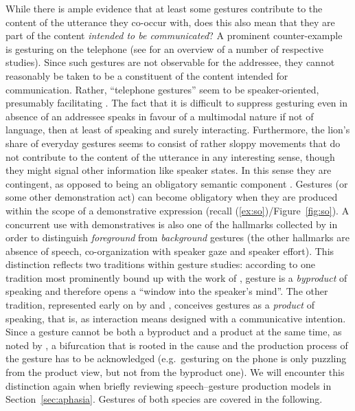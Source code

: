 \documentclass[output=paper
 	        ,biblatex
                ,babelshorthands
                ,newtxmath
                ,draftmode
                ,colorlinks, citecolor=brown
]{langscibook}
\begin{document}
While there is ample evidence that at least some gestures contribute to the content of the utterance they co-occur with, does this also mean that they are part of the content \emph{intended to be communicated}?
%
A prominent counter-example is gesturing on the telephone (see \citealt{Bavelas:Gerwing:Sutton:Prevost:2008} for an overview of a number of respective studies).
%
Since such gestures are not observable for the addressee, they cannot reasonably be taken to be a constituent of the content intended for communication.
%
Rather, \enquote{telephone gestures} seem to be speaker-oriented, presumably facilitating .
%
The fact that it is difficult to suppress gesturing even in absence of an addressee speaks in favour of a multimodal nature if not of language, then at least of speaking and surely interacting.
%
Furthermore, the lion's share of everyday gestures seems to consist of rather sloppy movements that do not contribute to the content of the utterance in any interesting sense, though they might signal other information like speaker states.
%
In this sense they are contingent, as opposed to being an obligatory semantic component \citep{Luecking:2013:a}.
%
Gestures (or some other demonstration act) can become obligatory when they are produced within the scope of a demonstrative expression (recall (\ref{ex:so})/Figure~\ref{fig:so}).
%
A concurrent use with demonstratives is also one of the hallmarks collected by \citet{Cooperrider:2017} in order to distinguish \emph{foreground} from \emph{background} gestures (the other hallmarks are absence of speech, co-organization with speaker gaze and speaker effort).
%
This distinction reflects two traditions within gesture studies: according to one tradition most prominently bound up with the work of \citet{McNeill:1992}, gesture is a \emph{byproduct} of speaking and therefore opens a \enquote{window into the speaker's mind}.
%
The other tradition, represented early on by \citet{Goodwin:2003} and \citet{Clark:1996}, conceives gestures as a \emph{product} of speaking, that is, as interaction means designed with a communicative intention.
%
Since a gesture cannot be both a byproduct and a product at the same time, as noted by \citet{Cooperrider:2017}, a bifurcation that is rooted in the cause and the production process of the gesture has to be acknowledged (e.g.\ gesturing on the phone is only puzzling from the product view, but not from the byproduct one). 
%
We will encounter this distinction again when briefly reviewing speech--gesture production models in Section~\ref{sec:aphasia}.
%
Gestures of both species are covered in the following.
\end{document}
